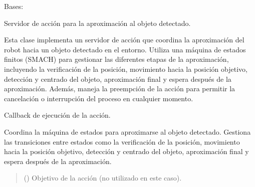 \documentclass[a4paper,10pt,spanish]{sphinxmanual}
\begin{document}
\begin{fulllineitems}
\label{\detokenize{squad_approach_control_action:squad_approach_control_action.ApproachObjectActionServer}}
\pysigstartsignatures
{}
\pysigstopsignatures
\sphinxAtStartPar
Bases: 

\sphinxAtStartPar
Servidor de acción para la aproximación al objeto detectado.

\sphinxAtStartPar
Esta clase implementa un servidor de acción que coordina la aproximación del robot hacia
un objeto detectado en el entorno. Utiliza una máquina de estados finitos (SMACH) para
gestionar las diferentes etapas de la aproximación, incluyendo la verificación de la posición,
movimiento hacia la posición objetivo, detección y centrado del objeto, aproximación final
y espera después de la aproximación. Además, maneja la preempción de la acción para permitir
la cancelación o interrupción del proceso en cualquier momento.

\begin{fulllineitems}
\label{\detokenize{squad_approach_control_action:squad_approach_control_action.ApproachObjectActionServer.execute_cb}}
\pysigstartsignatures
{}
\pysigstopsignatures
\sphinxAtStartPar
Callback de ejecución de la acción.

\sphinxAtStartPar
Coordina la máquina de estados para aproximarse al objeto detectado. Gestiona las transiciones
entre estados como la verificación de la posición, movimiento hacia la posición objetivo,
detección y centrado del objeto, aproximación final y espera después de la aproximación.
\begin{quote}\begin{description}
\sphinxAtStartPar
{} () \textendash{} Objetivo de la acción (no utilizado en este caso).


\end{description}
\end{quote}
\end{fulllineitems}
\end{fulllineitems}
\end{document}
